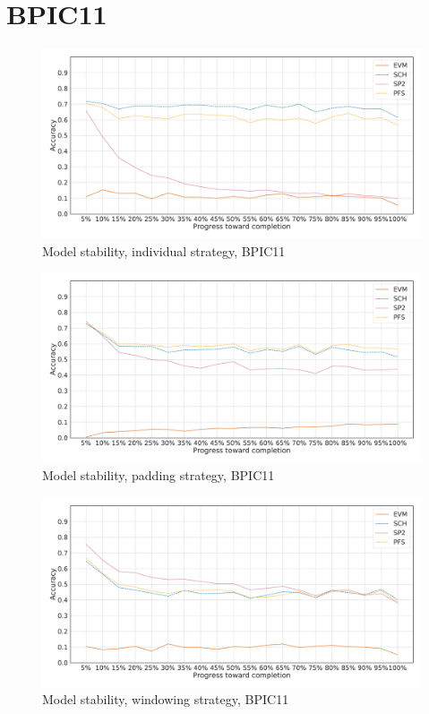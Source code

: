 \section*{BPIC11}\label{appendix:stability:bpic2011}
\begin{figure}[!htb]
    \centering
    \includegraphics[width=\textwidth]{gfx/bpic2011/individual_stability.pdf}
    \caption{Model stability, individual strategy, BPIC11}
    \label{fig:bpic11-individual-stability}
\end{figure}
\begin{figure}[!htb]
    \centering
    \includegraphics[width=\textwidth]{gfx/bpic2011/padded_stability.pdf}
    \caption{Model stability, padding strategy, BPIC11}
    \label{fig:bpic11-padded-stability}
\end{figure}
\begin{figure}[!htb]
    \centering
    \includegraphics[width=\textwidth]{gfx/bpic2011/windowed_stability.pdf}
    \caption{Model stability, windowing strategy, BPIC11}
    \label{fig:bpic11-windowed-stability}
\end{figure}
